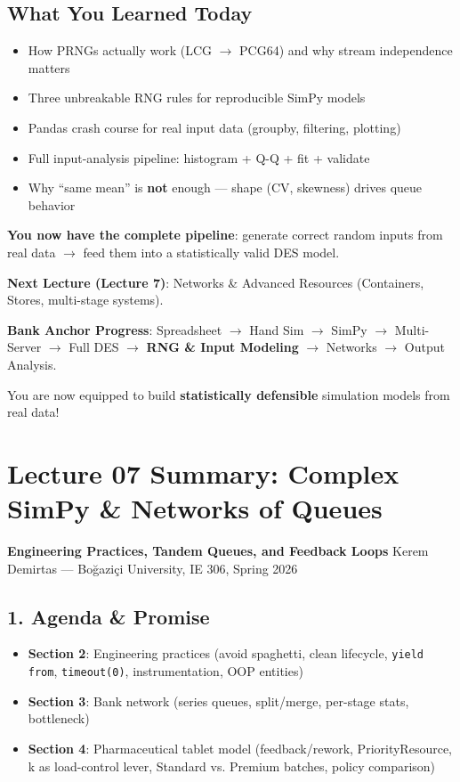 \documentclass[11pt]{article}
\begin{document}
\subsection*{What You Learned Today}
\begin{itemize}[leftmargin=*]
\item How PRNGs actually work (LCG $\rightarrow$ PCG64) and why stream independence matters
\item Three unbreakable RNG rules for reproducible SimPy models
\item Pandas crash course for real input data (groupby, filtering, plotting)
\item Full input-analysis pipeline: histogram + Q-Q + fit + validate
\item Why ``same mean'' is \textbf{not} enough --- shape (CV, skewness) drives queue behavior
\end{itemize}

\textbf{You now have the complete pipeline}: generate correct random inputs from real data $\rightarrow$ feed them into a statistically valid DES model.

\textbf{Next Lecture (Lecture 7)}: Networks \& Advanced Resources (Containers, Stores, multi-stage systems).

\textbf{Bank Anchor Progress}: Spreadsheet $\rightarrow$ Hand Sim $\rightarrow$ SimPy $\rightarrow$ Multi-Server $\rightarrow$ Full DES $\rightarrow$ \textbf{RNG \& Input Modeling} $\rightarrow$ Networks $\rightarrow$ Output Analysis.

You are now equipped to build \textbf{statistically defensible} simulation models from real data!

\section*{Lecture 07 Summary: Complex SimPy \& Networks of Queues}
\textbf{Engineering Practices, Tandem Queues, and Feedback Loops}
Kerem Demirtas --- Boğaziçi University, IE 306, Spring 2026

\subsection*{1. Agenda \& Promise}
\begin{itemize}[leftmargin=*]
\item \textbf{Section 2}: Engineering practices (avoid spaghetti, clean lifecycle, \texttt{yield from}, \texttt{timeout(0)}, instrumentation, OOP entities)
\item \textbf{Section 3}: Bank network (series queues, split/merge, per-stage stats, bottleneck)
\item \textbf{Section 4}: Pharmaceutical tablet model (feedback/rework, PriorityResource, k as load-control lever, Standard vs. Premium batches, policy comparison)
\end{itemize}
\end{document}
